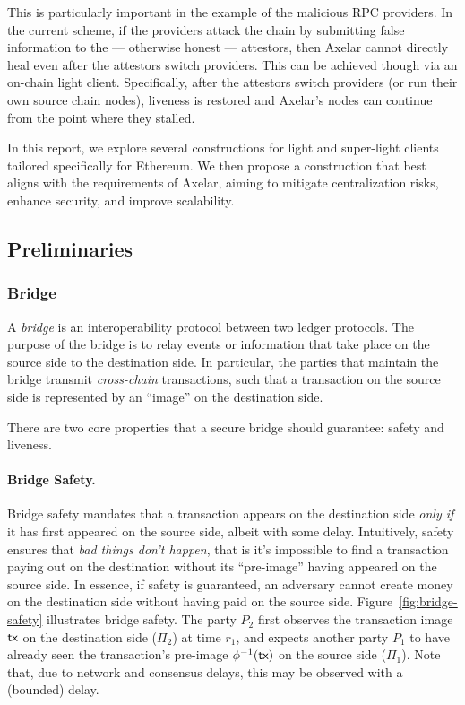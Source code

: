 This is particularly important in the example of the malicious RPC providers. In the current scheme, if the providers attack the chain by submitting false information to the --- otherwise honest --- attestors, then Axelar cannot directly heal even after the attestors switch providers. This can be achieved though via an on-chain light client. Specifically, after the attestors switch providers (or run their own source chain nodes), liveness is restored and Axelar's nodes can continue from the point where they stalled.

In this report, we explore several constructions for light and super-light clients tailored specifically for Ethereum. We then propose a construction that best aligns with the requirements of Axelar, aiming to mitigate centralization risks, enhance security, and improve scalability.

\subsection{Preliminaries}

\subsubsection{Bridge}
A \emph{bridge} is an interoperability protocol between two ledger protocols.
The purpose of the bridge is to relay events or information that take place on
the source side to the destination side. In particular, the parties that
maintain the bridge transmit \emph{cross-chain} transactions, such that a
transaction on the source side is represented by an ``image'' on the
destination side.

There are two core properties that a secure bridge should guarantee: safety and
liveness.

\paragraph{Bridge Safety.}
Bridge safety mandates that a transaction appears on the destination side \emph{only if} it has first
appeared on the source side, albeit with some delay.
%
Intuitively, safety ensures that \emph{bad
things don't happen}, that is it's impossible to find a transaction paying out on the
destination without its ``pre-image'' having appeared on the source side. 
In essence, if safety is guaranteed, an adversary cannot create money on the
destination side without having paid on the source side.
%
Figure~\ref{fig:bridge-safety} illustrates bridge safety.
The party $P_2$ first observes the transaction image $\textsf{tx}$ on the destination
side ($\Pi_2$) at time $r_1$, and expects another party $P_1$ to have already
seen the transaction's pre-image $\phi^{-1}(\textsf{tx})$ on the source side ($\Pi_1$).
Note that, due to network and consensus delays, this may be observed with a
(bounded) delay.

